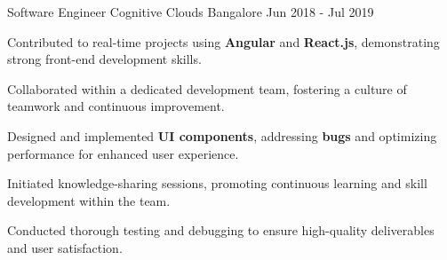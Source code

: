 \begin{cventries}
\cventry
    {Software Engineer}
    {Cognitive Clouds}
    {Bangalore}
    {Jun 2018 - Jul 2019}
    {
      \begin{cvitems}
        \item {Contributed to real-time projects using \textbf{Angular} and \textbf{React.js}, demonstrating strong front-end development skills.}
        \item {Collaborated within a dedicated development team, fostering a culture of teamwork and continuous improvement.}
        \item {Designed and implemented \textbf{UI components}, addressing \textbf{bugs} and optimizing performance for enhanced user experience.}
        \item {Initiated knowledge-sharing sessions, promoting continuous learning and skill development within the team.}
        \item {Conducted thorough testing and debugging to ensure high-quality deliverables and user satisfaction.}
      \end{cvitems}
    }




\end{cventries}
